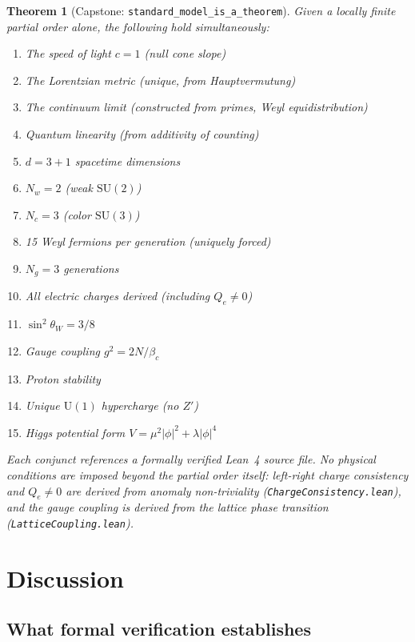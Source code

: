 \documentclass[11pt,letterpaper]{article}
\newtheorem{theorem}{Theorem}
\begin{document}
\begin{theorem}[Capstone: \texttt{standard\_model\_is\_a\_theorem}]
\label{thm:capstone}
Given a locally finite partial order alone, the following hold
simultaneously:
\begin{enumerate}[label=(\arabic*)]
  \item The speed of light $c = 1$ (null cone slope)
  \item The Lorentzian metric (unique, from Hauptvermutung)
  \item The continuum limit (constructed from primes, Weyl equidistribution)
  \item Quantum linearity (from additivity of counting)
  \item $d = 3{+}1$ spacetime dimensions
  \item $N_w = 2$ (weak $\mathrm{SU}(2)$)
  \item $N_c = 3$ (color $\mathrm{SU}(3)$)
  \item 15 Weyl fermions per generation (uniquely forced)
  \item $N_g = 3$ generations
  \item All electric charges derived (including $Q_e \neq 0$)
  \item $\sin^2\theta_W = 3/8$
  \item Gauge coupling $g^2 = 2N/\beta_c$
  \item Proton stability
  \item Unique $\mathrm{U}(1)$ hypercharge (no $Z'$)
  \item Higgs potential form $V = \mu^2|\phi|^2 + \lambda|\phi|^4$
\end{enumerate}
Each conjunct references a formally verified Lean~4 source file.
No physical conditions are imposed beyond the partial order itself:
left-right charge consistency and $Q_e \neq 0$ are derived from
anomaly non-triviality (\texttt{ChargeConsistency.lean}), and the
gauge coupling is derived from the lattice phase transition
(\texttt{LatticeCoupling.lean}).
\end{theorem}

\section{Discussion}

\subsection{What formal verification establishes}
\end{document}
